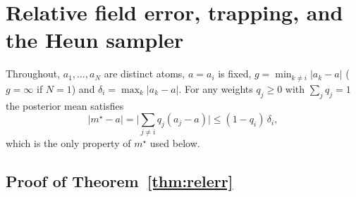 \documentclass{article} %
\theoremstyle{plain}
\theoremstyle{definition}
\theoremstyle{remark}
\begin{document}
\section{Relative field error, trapping, and the Heun sampler}
\label{app:relerr}

Throughout, $a_1,\dots,a_N$ are distinct atoms, $a=a_i$ is fixed,
$g=\min_{k\ne i}|a_k-a|$ ($g=\infty$ if $N=1$) and $\delta_i=\max_k|a_k-a|$. For any weights
$q_j\ge0$ with $\sum_jq_j=1$ the posterior mean satisfies
\begin{equation}
|m^\star-a|=\Big|\sum_{j\ne i}q_j(a_j-a)\Big|\le(1-q_i)\,\delta_i,
\label{eq:offmass}
\end{equation}
which is the only property of $m^\star$ used below.

\subsection{Proof of Theorem~\ref{thm:relerr}}
\label{apx:pf-relerr}

\thmrelerr*
\end{document}
